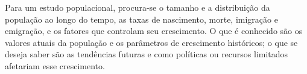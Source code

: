 Para um estudo populacional, procura-se o tamanho e a distribuição da população ao longo do tempo, as taxas de nascimento, morte, imigração e emigração, e os fatores que controlam seu crescimento. O que é conhecido são os valores atuais da população e os parâmetros de crescimento históricos; o que se deseja saber são as tendências futuras e como políticas ou recursos limitados afetariam esse crescimento.